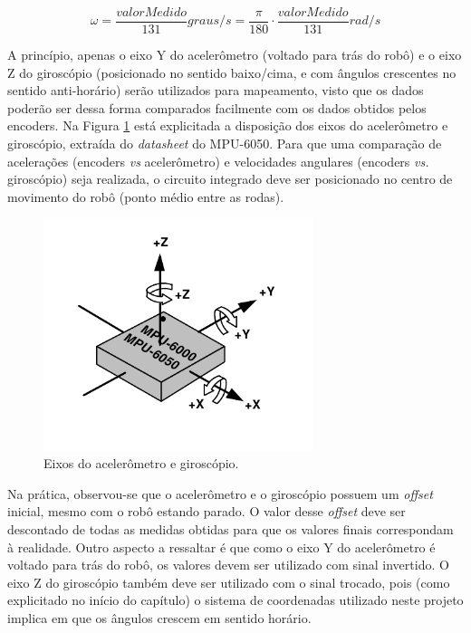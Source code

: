 \begin{equation}
  \omega = \frac{valorMedido}{131} \unit{graus/s} = \frac{\pi}{180} \cdot \frac{valorMedido}{131} \unit{rad/s}
  \label{eq:giro}
\end{equation}


A princípio, apenas o eixo Y do acelerômetro (voltado para trás do robô) e o eixo Z do giroscópio (posicionado no sentido baixo/cima, e com ângulos crescentes no sentido anti-horário) serão utilizados para mapeamento, visto que os dados poderão ser dessa forma comparados facilmente com os dados obtidos pelos encoders. Na Figura \ref{fig:eixos_acel_giro} está explicitada a disposição dos eixos do acelerômetro e giroscópio, extraída do \textit{datasheet} do MPU-6050. Para que uma comparação de acelerações (encoders \textit{vs} acelerômetro) e velocidades angulares (encoders \textit{vs.} giroscópio) seja realizada, o circuito integrado deve ser posicionado no centro de movimento do robô (ponto médio entre as rodas).

\begin{figure}[H]
	\centering
	\includegraphics[width=0.7\textwidth]{./figuras/hardware/eixos_mpu.png}
	\caption{Eixos do acelerômetro e giroscópio.}
	\label{fig:eixos_acel_giro}
\end{figure}

Na prática, observou-se que o acelerômetro e o giroscópio possuem um \textit{offset} inicial, mesmo com o robô estando parado. O valor desse \textit{offset} deve ser descontado de todas as medidas obtidas para que os valores finais correspondam à realidade. Outro aspecto a ressaltar é que como o eixo Y do acelerômetro é voltado para trás do robô, os valores devem ser utilizado com sinal invertido. O eixo Z do giroscópio também deve ser utilizado com o sinal trocado, pois (como explicitado no início do capítulo) o sistema de coordenadas utilizado neste projeto implica em que os ângulos crescem em sentido horário.

